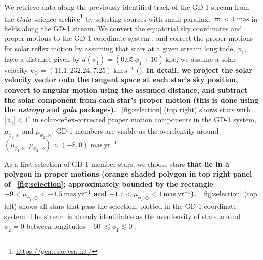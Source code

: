 \documentclass[modern]{aastex62}
\newcommand{\package}[1]{\textsl{#1}}
\newcommand{\gaia}{\textsl{Gaia}}
\newcommand{\kms}{\ensuremath{\textrm{km}~\textrm{s}^{-1}}}
\newcommand{\bs}[1]{\boldsymbol{#1}}
\newcommand{\masyr}{\ensuremath{\textrm{mas}~\textrm{yr}^{-1}}}
\newcommand{\changes}[1]{{\textbf{#1}}}
\begin{document}
We retrieve data along the previously-identified track of the GD-1 stream
from the \gaia\ science archive\footnote{\url{https://gea.esac.esa.int/}} by
selecting sources with small parallax, $\varpi < 1~\textrm{mas}$ in fields along the GD-1 stream.
We convert the equatorial sky coordinates and proper motions %
to the GD-1 coordinate system \citep[$\phi_1, \phi_2$,][]{Koposov:2010}, and correct the proper motions for solar reflex
motion by assuming that stars at a given stream longitude, $\phi_1$, have a
distance given by $d(\phi_1) = (0.05 \, \phi_1 + 10)~\textrm{kpc}$;
we assume a solar velocity $\bs{v}_\odot = (11.1, 232.24, 7.25)~\kms$
(\citealt{Schonrich:2010, Bovy:2015}).
\changes{In detail, we project the solar velocity vector onto the tangent space at each star's sky position, convert to angular motion using the assumed distance, and subtract the solar component from each star's proper motion (this is done using the \package{astropy} \citep{astropy} and \package{gala} \citep{gala} packages).}
\figurename~\ref{fig:selection} (top right) shows stars with $|\phi_2| <
1^\circ$ in solar-reflex-corrected proper motion components in the GD-1 system,
$\mu_{\phi_1, \odot}$ and $\mu_{\phi_2, \odot}$.
GD-1 members are visible as the overdensity around $(\mu_{\phi_1, \odot},
\mu_{\phi_2, \odot}) \approx (-8, 0)~\masyr$.

As a first selection of GD-1 member stars, we choose stars \changes{that lie in a polygon in proper motions (orange shaded polygon in top right panel of \figurename~\ref{fig:selection}; approximately bounded by the rectangle
$-9 < \mu_{\phi_1, \odot} < -4.5~\masyr$ and $-1.7 < \mu_{\phi_2, \odot} <
1~\masyr$).}
\figurename~\ref{fig:selection} (top left) shows all stars that pass the
selection, plotted in the GD-1 coordinate system.
The stream is already identifiable as the overdensity of stars around $\phi_2 =
0$ between longitudes $-60^\circ \lesssim \phi_1 \lesssim 0^\circ$.
\end{document}
